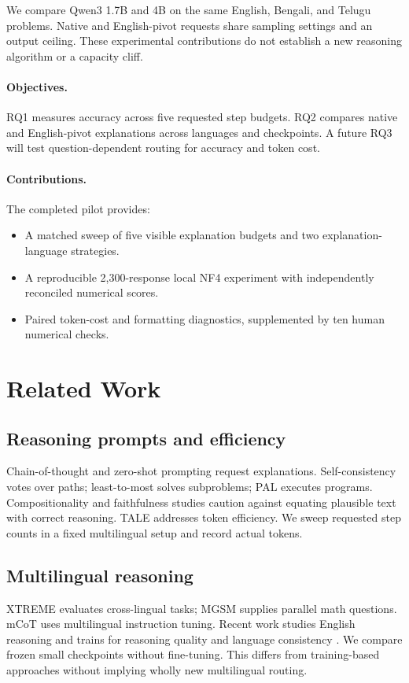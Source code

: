 \documentclass[11pt]{article}
\begin{document}
We compare Qwen3 1.7B and 4B \citep{qwen2025} on the same English, Bengali, and Telugu problems. Native and English-pivot requests share sampling settings and an output ceiling. These experimental contributions do not establish a new reasoning algorithm or a capacity cliff.

\paragraph{Objectives.}
RQ1 measures accuracy across five requested step budgets. RQ2 compares native and English-pivot explanations across languages and checkpoints. A future RQ3 will test question-dependent routing for accuracy and token cost.

\paragraph{Contributions.}
The completed pilot provides:
\begin{itemize}
\item A matched sweep of five visible explanation budgets and two explanation-language strategies.
\item A reproducible 2,300-response local NF4 experiment with independently reconciled numerical scores.
\item Paired token-cost and formatting diagnostics, supplemented by ten human numerical checks.
\end{itemize}

\section{Related Work}
\subsection{Reasoning prompts and efficiency}
Chain-of-thought \citep{wei2022cot} and zero-shot prompting \citep{kojima2022zeroshot} request explanations. Self-consistency \citep{wang2023selfconsistency} votes over paths; least-to-most \citep{zhou2023leasttomost} solves subproblems; PAL \citep{gao2023pal} executes programs. Compositionality \citep{press2023compositionality} and faithfulness \citep{turpin2023faithfulness} studies caution against equating plausible text with correct reasoning. TALE \citep{han2025tale} addresses token efficiency. We sweep requested step counts in a fixed multilingual setup and record actual tokens.

\subsection{Multilingual reasoning}
XTREME \citep{hu2020xtreme} evaluates cross-lingual tasks; MGSM \citep{shi2023mgsm} supplies parallel math questions. mCoT \citep{mcot2024} uses multilingual instruction tuning. Recent work studies English reasoning \citep{linguafranca2026} and trains for reasoning quality and language consistency \citep{lang2026}. We compare frozen small checkpoints without fine-tuning. This differs from training-based approaches without implying wholly new multilingual routing.
\end{document}
